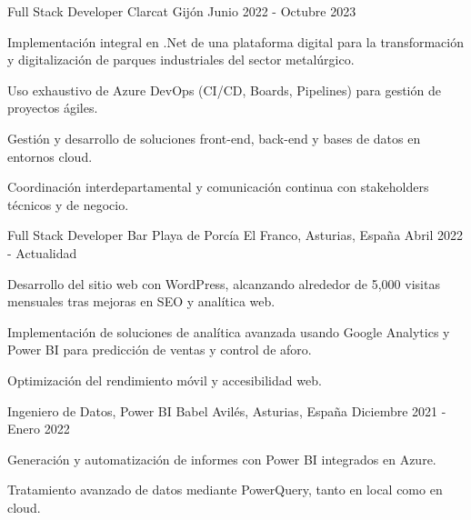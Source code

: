 \begin{cventries}
{    }
    \cventry
    {Full Stack Developer} %
    {Clarcat} %
    {Gijón} %
    {Junio 2022 - Octubre 2023} %
    {
        \begin{cvitems}
            \item {Implementación integral en .Net de una plataforma digital para la transformación y digitalización de parques industriales del sector metalúrgico.}
            \item {Uso exhaustivo de Azure DevOps (CI/CD, Boards, Pipelines) para gestión de proyectos ágiles.}
            \item {Gestión y desarrollo de soluciones front-end, back-end y bases de datos en entornos cloud.}
            \item {Coordinación interdepartamental y comunicación continua con stakeholders técnicos y de negocio.}
        \end{cvitems}
    }
    \cventry
    {Full Stack Developer} %
    {Bar Playa de Porcía} %
    {El Franco, Asturias, España} %
    {Abril 2022 - Actualidad} %
    {
        \begin{cvitems}
            \item {Desarrollo del sitio web con WordPress, alcanzando alrededor de 5,000 visitas mensuales tras mejoras en SEO y analítica web.}
            \item {Implementación de soluciones de analítica avanzada usando Google Analytics y Power BI para predicción de ventas y control de aforo.}
            \item {Optimización del rendimiento móvil y accesibilidad web.}
        \end{cvitems}
    }
    \cventry
    {Ingeniero de Datos, Power BI} %
    {Babel} %
    {Avilés, Asturias, España} %
    {Diciembre 2021 - Enero 2022} %
    {
        \begin{cvitems}
            \item {Generación y automatización de informes con Power BI integrados en Azure.}
            \item {Tratamiento avanzado de datos mediante PowerQuery, tanto en local como en cloud.}
        \end{cvitems}
    }

\end{cventries}
